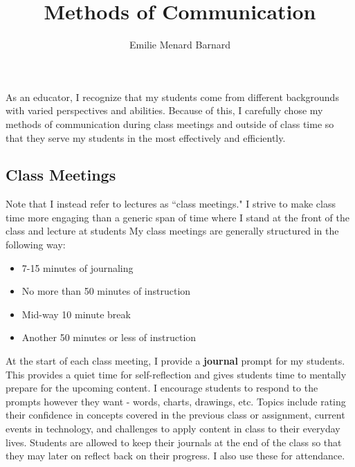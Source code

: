 \documentclass[12pt]{amsart} \usepackage{amssymb}
\title[]{Methods of Communication}
\author[]{Emilie Menard Barnard}
\begin{document}
\maketitle
\thispagestyle{empty}

As an educator, I recognize that my students come from different backgrounds with varied perspectives and abilities. Because of this, I carefully chose my methods of communication during class meetings and outside of class time so that they serve my students in the most effectively and efficiently.

\subsection*{Class Meetings}
Note that I instead refer to lectures as ``class meetings." I strive to make class time more engaging than a generic span of time where I stand at the front of the class and lecture at students My class meetings are generally structured in the following way: 
\begin{itemize}
\item 7-15 minutes of journaling
\item No more than 50 minutes of instruction
\item Mid-way 10 minute break
\item Another 50 minutes or less of instruction
\end{itemize}

At the start of each class meeting, I provide a \textbf{journal} prompt for my students. This provides a quiet time for self-reflection and gives students time to mentally prepare for the upcoming content. I encourage students to respond to the prompts however they want - words, charts, drawings, etc. Topics include rating their confidence in concepts covered in the previous class or assignment, current events in technology, and challenges to apply content in class to their everyday lives. Students are allowed to keep their journals at the end of the class so that they may later on reflect back on their progress. I also use these for attendance. 
\end{document}
